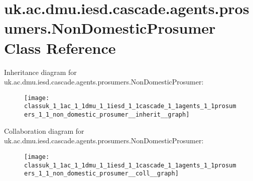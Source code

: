 \hypertarget{classuk_1_1ac_1_1dmu_1_1iesd_1_1cascade_1_1agents_1_1prosumers_1_1_non_domestic_prosumer}{\section{uk.\-ac.\-dmu.\-iesd.\-cascade.\-agents.\-prosumers.\-Non\-Domestic\-Prosumer Class Reference}
\label{classuk_1_1ac_1_1dmu_1_1iesd_1_1cascade_1_1agents_1_1prosumers_1_1_non_domestic_prosumer}
}


Inheritance diagram for uk.\-ac.\-dmu.\-iesd.\-cascade.\-agents.\-prosumers.\-Non\-Domestic\-Prosumer\-:\nopagebreak
\begin{figure}[H]
\begin{center}
\leavevmode
\texttt{[image: classuk\_1\_1ac\_1\_1dmu\_1\_1iesd\_1\_1cascade\_1\_1agents\_1\_1prosumers\_1\_1\_non\_domestic\_prosumer\_\_inherit\_\_graph]}
\end{center}
\end{figure}


Collaboration diagram for uk.\-ac.\-dmu.\-iesd.\-cascade.\-agents.\-prosumers.\-Non\-Domestic\-Prosumer\-:\nopagebreak
\begin{figure}[H]
\begin{center}
\leavevmode
\texttt{[image: classuk\_1\_1ac\_1\_1dmu\_1\_1iesd\_1\_1cascade\_1\_1agents\_1\_1prosumers\_1\_1\_non\_domestic\_prosumer\_\_coll\_\_graph]}
\end{center}
\end{figure}

